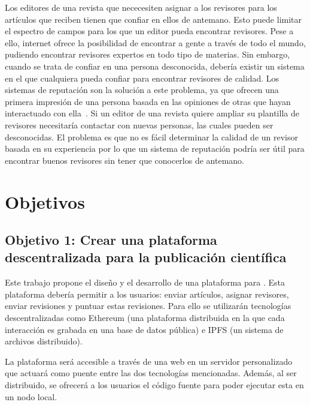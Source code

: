 Los editores de una revista que nececesiten asignar a los revisores para los
artículos que reciben tienen que confiar en ellos de antemano. Esto puede
limitar el espectro de campos para los que un editor pueda encontrar revisores.
Pese a ello, internet ofrece la posibilidad de encontrar a gente a través de
todo el mundo, pudiendo encontrar revisores expertos en todo tipo de materias.
Sin embargo, cuando se trata de confiar en una persona desconocida, debería
existir un sistema en el que cualquiera pueda confiar para encontrar revisores
de calidad. Los sistemas de reputación son la solución a este problema, ya
que ofrecen una primera impresión de una persona basada en las opiniones de
otras que hayan interactuado con ella~\cite{resnick2000reputation}. Si un editor
de una revista quiere ampliar su plantilla de revisores necesitaría contactar
con nuevas personas, las cuales pueden ser desconocidas. El problema es que no
es fácil determinar la calidad de un revisor basada en su experiencia
\cite{callaham_relationship_2007} por lo que un sistema de reputación podría ser
útil para encontrar buenos revisores sin tener que conocerlos de antemano.

\section{Objetivos}
\label{sec:objectives-1}
\subsection*{Objetivo 1: Crear una plataforma descentralizada para la publicación
  científica}

Este trabajo propone el diseño y el desarrollo de una plataforma para . Esta plataforma debería permitir a los usuarios: enviar artículos,
asignar revisores, enviar revisiones y puntuar estas revisiones. Para ello se
utilizarán tecnologías descentralizadas como Ethereum (una plataforma
distribuida en la que cada interacción es grabada en una base de datos pública)
e IPFS (un sistema de archivos distribuido).

La plataforma será accesible a través de una web en un servidor personalizado
que actuará como puente entre las dos tecnologías mencionadas. Además, al ser
distribuido, se ofrecerá a los usuarios el código fuente para poder ejecutar esta en un nodo local.

